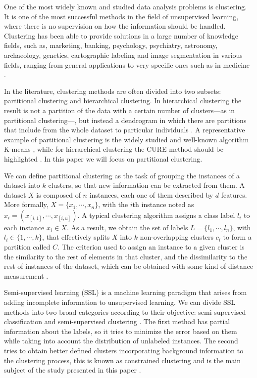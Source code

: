 \documentclass[review]{elsarticle}
\begin{document}
One of the most widely known and studied data analysis problems is clustering. It is one of the most successful methods in the field of unsupervised learning, where there is no supervision on how the information should be handled. Clustering has been able to provide solutions in a large number of knowledge fields, such as, marketing, banking, psychology, psychiatry, astronomy, archaeology, genetics,\cite{Everitt:2009:CA:1538772} cartographic labeling \cite{araujo2019improving} and image segmentation in various fields, ranging from general applications \cite{wang2018non} to very specific ones such as in medicine \cite{verma2016improved, aparajeeta2016modified}.

In the literature, clustering methods are often divided into two subsets: partitional clustering and hierarchical clustering. In hierarchical clustering the result is not a partition of the data with a certain number of clusters---as in partitional clustering---, but instead a dendrogram in which there are partitions that include from the whole dataset to particular individuals \cite{Everitt:2009:CA:1538772}. A representative example of partitional clustering is the widely studied and well-known algorithm K-means \cite{wu2009top}, while for hierarchical clustering the CURE method should be highlighted \cite{guha1998cure}. In this paper we will focus on partitional clustering.

We can define partitional clustering as the task of grouping the instances of a dataset into $k$ clusters, so that new information can be extracted from them. A dataset $X$ is composed of $n$ instances, each one of them described by $d$ features. More formally, $X = \{x_1, \cdots, x_n\}$, with the $i$th instance noted as $x_i = (x_{[i,1]}, \cdots, x_{[i,u]})$. A typical clustering algorithm assigns a class label $l_i$ to each instance $x_i \in X$. As a result, we obtain the set of labels $L = \{l_1, \cdots, l_n\}$, with $l_i \in \{1, \cdots, k\}$, that effectively splits $X$ into $k$ non-overlapping clusters $c_i$ to form a partition called $C$. The criterion used to assign an instance to a given cluster is the similarity to the rest of elements in that cluster, and the dissimilarity to the rest of instances of the dataset, which can be obtained with some kind of distance measurement \cite{jain1999data}.

Semi-supervised learning (SSL) is a machine learning paradigm that arises from adding incomplete information to unsupervised learning. We can divide SSL methods into two broad categories according to their objective: semi-supervised classification and semi-supervised clustering \cite{chapelle2009semi}. The first method has partial information about the labels, so it tries to minimize the error based on them while taking into account the distribution of unlabeled instances. The second tries to obtain better defined clusters incorporating background information to the clustering process, this is known as constrained clustering and is the main subject of the study presented in this paper \cite{triguero2015self}. 
\end{document}
